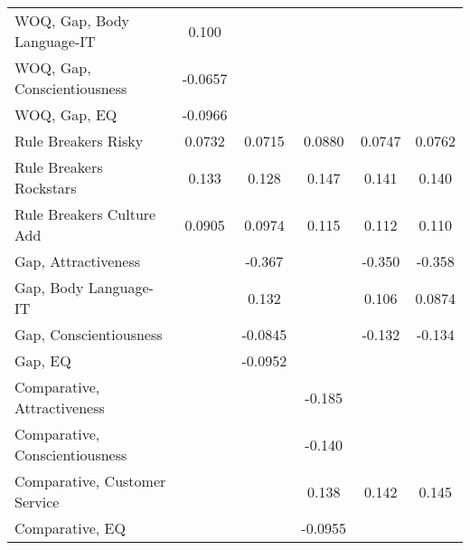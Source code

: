 {\begin{center}
{\begin{longtable}{l*{5}{c}}
\addlinespace
WOQ, Gap, Body Language-IT&       0.100         &                     &                     &                     &                     \\
\addlinespace
WOQ, Gap, Conscientiousness&     -0.0657         &                     &                     &                     &                     \\
\addlinespace
WOQ, Gap, EQ             &     -0.0966         &                     &                     &                     &                     \\
\addlinespace
Rule Breakers Risky      &      0.0732\sym{*}  &      0.0715\sym{*}  &      0.0880\sym{**} &      0.0747\sym{*}  &      0.0762\sym{*}  \\
\addlinespace
Rule Breakers Rockstars  &       0.133\sym{**} &       0.128\sym{**} &       0.147\sym{**} &       0.141\sym{**} &       0.140\sym{**} \\
\addlinespace
Rule Breakers Culture Add&      0.0905         &      0.0974\sym{*}  &       0.115\sym{**} &       0.112\sym{**} &       0.110\sym{**} \\
\addlinespace
Gap, Attractiveness      &                     &      -0.367\sym{***}&                     &      -0.350\sym{***}&      -0.358\sym{***}\\
\addlinespace
Gap, Body Language-IT    &                     &       0.132         &                     &       0.106         &      0.0874         \\
\addlinespace
Gap, Conscientiousness   &                     &     -0.0845         &                     &      -0.132\sym{**} &      -0.134\sym{**} \\
\addlinespace
Gap, EQ                  &                     &     -0.0952         &                     &                     &                     \\
\addlinespace
Comparative, Attractiveness&                    &                     &      -0.185\sym{*}  &                     &                     \\
\addlinespace
Comparative, Conscientiousness&                     &                     &      -0.140         &                     &                     \\
\addlinespace
Comparative, Customer Service&                     &                     &       0.138         &       0.142\sym{*}  &       0.145\sym{*}  \\
\addlinespace
Comparative, EQ          &                     &                     &     -0.0955         &                     &                     \\

\end{longtable}}
\end{center}}
